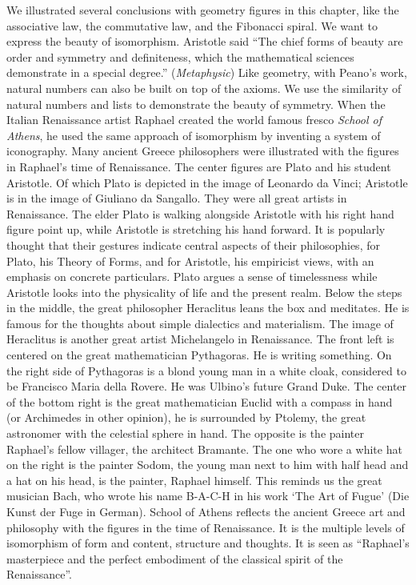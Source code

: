 \documentclass[UTF8]{article}
\begin{document}
We illustrated several conclusions with geometry figures in this chapter, like the associative law, the commutative law, and the Fibonacci spiral. We want to express the beauty of isomorphism. Aristotle said
``The chief forms of beauty are order and symmetry and definiteness, which the mathematical sciences demonstrate in a special degree.'' ({\em Metaphysic}) Like geometry, with Peano's work, natural numbers can also be built on top of the axioms. We use the similarity of natural numbers and lists to demonstrate the beauty of symmetry. When the Italian Renaissance artist Raphael created the world famous fresco {\em School of Athens}, he used the same approach of isomorphism by inventing a system of iconography. Many ancient Greece philosophers were illustrated with the figures in Raphael's time of Renaissance. The center figures are Plato and his student Aristotle. Of which Plato is depicted in the image of Leonardo da Vinci; Aristotle is in the image of Giuliano da Sangallo. They were all great artists in Renaissance. The elder Plato is walking alongside Aristotle with his right hand figure point up, while Aristotle is stretching his hand forward. It is popularly thought that their gestures indicate central aspects of their philosophies, for Plato, his Theory of Forms, and for Aristotle, his empiricist views, with an emphasis on concrete particulars. Plato argues a sense of timelessness while Aristotle looks into the physicality of life and the present realm. Below the steps in the middle, the great philosopher Heraclitus leans the box and meditates. He is famous for the thoughts about simple dialectics and materialism. The image of Heraclitus is another great artist Michelangelo in Renaissance. The front left is centered on the great mathematician Pythagoras. He is writing something. On the right side of Pythagoras is a blond young man in a white cloak, considered to be Francisco Maria della Rovere. He was Ulbino's future Grand Duke. The center of the bottom right is the great mathematician Euclid with a compass in hand (or Archimedes in other opinion), he is surrounded by Ptolemy, the great astronomer with the celestial sphere in hand. The opposite is the painter Raphael's fellow villager, the architect Bramante. The one who wore a white hat on the right is the painter Sodom, the young man next to him with half head and a hat on his head, is the painter, Raphael himself. This reminds us the great musician Bach, who wrote his name B-A-C-H in his work `The Art of Fugue' (Die Kunst der Fuge in German). School of Athens reflects the ancient Greece art and philosophy with the figures in the time of Renaissance. It is the multiple levels of isomorphism of form and content, structure and thoughts. It is seen as ``Raphael's masterpiece and the perfect embodiment of the classical spirit of the Renaissance''.
\end{document}
